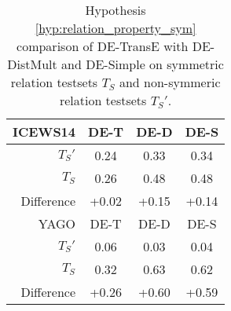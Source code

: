 \begin{table}[htb]
\centering
\begin{minipage}{0.95\columnwidth}
\centering
\caption{Hypothesis \autoref{hyp:relation_property_sym} comparison of DE-TransE with DE-DistMult and DE-Simple on symmetric relation testsets $T_S$ and non-symmeric relation testsets $T_S'$.}
\vspace{-3mm}

\begin{tabular}{r|ccc}\hline
ICEWS14 & DE-T & DE-D & DE-S \\ \hline
$T_S'$ & 0.24 & 0.33 & 0.34 \\
$T_S$ & 0.26 & 0.48 & 0.48 \\ \hline
Difference & +0.02 & +0.15 & +0.14 \\ \hline\hline
YAGO & DE-T & DE-D & DE-S \\ \hline
$T_S'$ & 0.06 & 0.03 & 0.04 \\
$T_S$ & 0.32 & 0.63 & 0.62 \\ \hline
Difference & +0.26 & +0.60 & +0.59 \\
 \hline
\end{tabular}

\label{tab:hypothesis_3_a_comparison}
\end{minipage}
\end{table}

